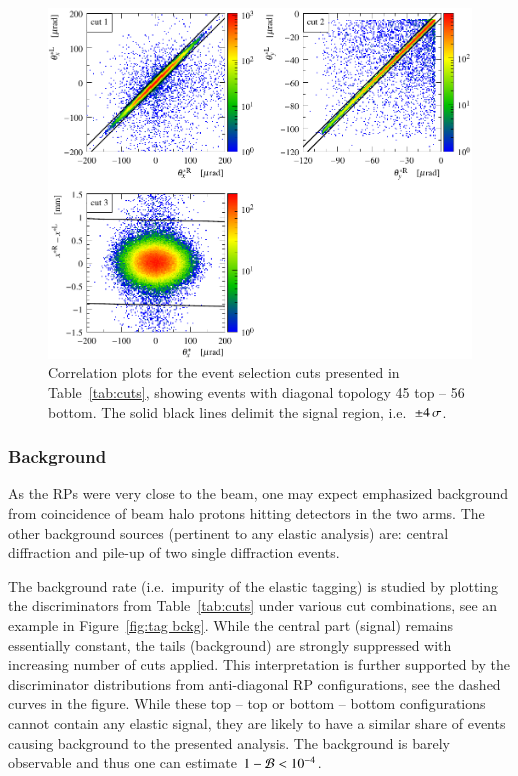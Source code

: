 \begin{figure}
\begin{center}
\includegraphics{fig/cuts.pdf}
\caption{%
Correlation plots for the event selection cuts presented in Table~\ref{tab:cuts}, showing events with diagonal topology 45 top -- 56 bottom. The solid black lines delimit the signal region, i.e.~$\pm 4\,{\rm \sigma}$.
}
\label{fig:cuts}
\end{center}
\end{figure}



\subsubsection{Background}
\label{sec:background}

As the RPs were very close to the beam, one may expect emphasized background from coincidence of beam halo protons hitting detectors in the two arms. The other background sources (pertinent to any elastic analysis) are: central diffraction and pile-up of two single diffraction events.

The background rate (i.e.~impurity of the elastic tagging) is studied by plotting the discriminators from Table~\ref{tab:cuts} under various cut combinations, see an example in Figure~\ref{fig:tag bckg}. While the central part (signal) remains essentially constant, the tails (background) are strongly suppressed with increasing number of cuts applied. This interpretation is further supported by the discriminator distributions from anti-diagonal RP configurations, see the dashed curves in the figure. While these top -- top or bottom -- bottom configurations cannot contain any elastic signal, they are likely to have a similar share of events causing background to the presented analysis. The background is barely observable and thus one can estimate $1 - {\cal B} < 10^{-4}$.


